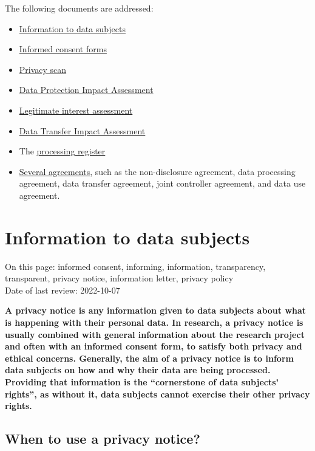 \documentclass[
]{book}
\providecommand{\tightlist}{%
  \setlength{\itemsep}{0pt}\setlength{\parskip}{0pt}}
\begin{document}
The following documents are addressed:

\begin{itemize}
\tightlist
\item
  \protect\hyperlink{privacy-notices}{Information to data subjects}
\item
  \protect\hyperlink{informed-consent-forms}{Informed consent forms}
\item
  \protect\hyperlink{privacy-scan}{Privacy scan}
\item
  \protect\hyperlink{dpia}{Data Protection Impact Assessment}
\item
  \protect\hyperlink{legitimate-interest-assessment}{Legitimate interest assessment}
\item
  \protect\hyperlink{dtia}{Data Transfer Impact Assessment}
\item
  The \protect\hyperlink{processing-register}{processing register}
\item
  \protect\hyperlink{agreements}{Several agreements}, such as the non-disclosure agreement, data processing
  agreement, data transfer agreement, joint controller agreement, and data use
  agreement.
\end{itemize}

\hypertarget{privacy-notices}{%
\section{Information to data subjects}\label{privacy-notices}}

On this page: informed consent, informing, information, transparency,
transparent, privacy notice, information letter, privacy policy\\
Date of last review: 2022-10-07

\textbf{A privacy notice is any information given to data subjects about what is
happening with their personal data. In research, a privacy notice is usually
combined with general information about the research project and often with an
informed consent form, to satisfy both privacy and ethical concerns. Generally,
the aim of a privacy notice is to inform data subjects on how and why their
data are being processed. Providing that information is the ``cornerstone of
data subjects' rights'', as without it, data subjects cannot exercise their other
privacy rights.}

\hypertarget{when-to-use-a-privacy-notice}{%
\subsection{When to use a privacy notice?}\label{when-to-use-a-privacy-notice}}
\end{document}
